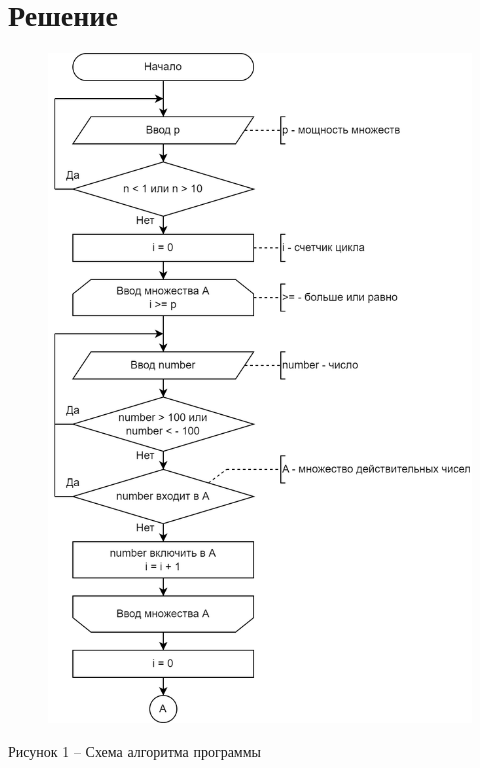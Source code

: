 \documentclass[a4paper,14pt]{extarticle}
\begin{document}
	\section*{Решение}
	\begin{figure}[h]
		\centering
		\includegraphics[width=0.7\linewidth]{images/s-1}
	\end{figure}
	\begin{center}
		Рисунок 1 – Схема алгоритма программы
	\end{center}
	
\end{document}
